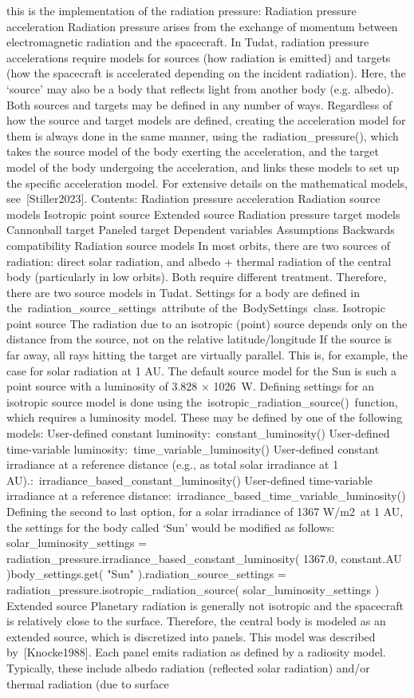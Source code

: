 {}this is the implementation of the radiation pressure: Radiation pressure acceleration Radiation pressure arises from the exchange of momentum between electromagnetic radiation and the spacecraft. In Tudat, radiation pressure accelerations require models for sources (how radiation is emitted) and targets (how the spacecraft is accelerated depending on the incident radiation). Here, the ‘source’ may also be a body that reflects light from another body (e.g. albedo). Both sources and targets may be defined in any number of ways. Regardless of how the source and target models are defined, creating the acceleration model for them is always done in the same manner, using the radiation_pressure(), which takes the source model of the body exerting the acceleration, and the target model of the body undergoing the acceleration, and links these models to set up the specific acceleration model. For extensive details on the mathematical models, see [Stiller2023]. Contents: Radiation pressure acceleration Radiation source models Isotropic point source Extended source Radiation pressure target models Cannonball target Paneled target Dependent variables Assumptions Backwards compatibility Radiation source models In most orbits, there are two sources of radiation: direct solar radiation, and albedo + thermal radiation of the central body (particularly in low orbits). Both require different treatment. Therefore, there are two source models in Tudat. Settings for a body are defined in the radiation_source_settings attribute of the BodySettings class. Isotropic point source The radiation due to an isotropic (point) source depends only on the distance from the source, not on the relative latitude/longitude If the source is far away, all rays hitting the target are virtually parallel. This is, for example, the case for solar radiation at 1 AU. The default source model for the Sun is such a point source with a luminosity of 3.828 × 1026 W. Defining settings for an isotropic source model is done using the isotropic_radiation_source() function, which requires a luminosity model. These may be defined by one of the following models: User-defined constant luminosity: constant_luminosity() User-defined time-variable luminosity: time_variable_luminosity() User-defined constant irradiance at a reference distance (e.g., as total solar irradiance at 1 AU).: irradiance_based_constant_luminosity() User-defined time-variable irradiance at a reference distance: irradiance_based_time_variable_luminosity() Defining the second to last option, for a solar irradiance of 1367 W/m2 at 1 AU, the settings for the body called ‘Sun’ would be modified as follows: solar_luminosity_settings = radiation_pressure.irradiance_based_constant_luminosity( 1367.0, constant.AU )body_settings.get( "Sun" ).radiation_source_settings = radiation_pressure.isotropic_radiation_source( solar_luminosity_settings ) Extended source Planetary radiation is generally not isotropic and the spacecraft is relatively close to the surface. Therefore, the central body is modeled as an extended source, which is discretized into panels. This model was described by [Knocke1988]. Each panel emits radiation as defined by a radiosity model. Typically, these include albedo radiation (reflected solar radiation) and/or thermal radiation (due to surface 